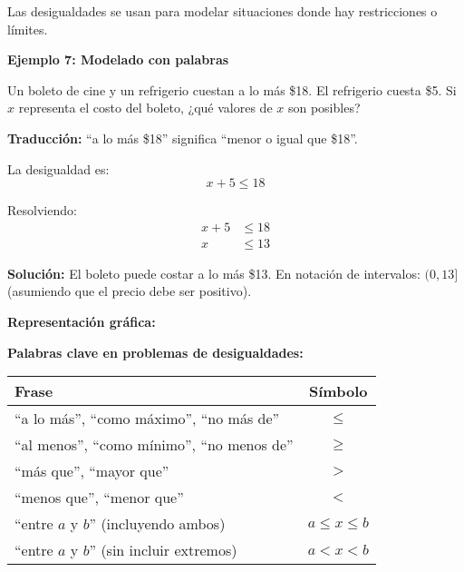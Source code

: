 Las desigualdades se usan para modelar situaciones donde hay restricciones o límites.

\begin{example}
\textbf{Ejemplo 7: Modelado con palabras}

Un boleto de cine y un refrigerio cuestan a lo más \$18. El refrigerio cuesta \$5. Si $x$ representa el costo del boleto, ¿qué valores de $x$ son posibles?

\solution

\textbf{Traducción:} ``a lo más \$18'' significa ``menor o igual que \$18''.

La desigualdad es:
\[x + 5 \le 18\]

Resolviendo:
\begin{align*}
x + 5 &\le 18 \\
x &\le 13
\end{align*}

\textbf{Solución:} El boleto puede costar a lo más \$13. En notación de intervalos: $(0, 13]$ (asumiendo que el precio debe ser positivo).

\textbf{Representación gráfica:}

\begin{center}
\end{center}
\end{example}

\vspace{1cm}

\textbf{Palabras clave en problemas de desigualdades:}

\begin{center}
\begin{tabular}{|l|c|}
\hline
\textbf{Frase} & \textbf{Símbolo} \\
\hline
``a lo más'', ``como máximo'', ``no más de'' & $\le$ \\
``al menos'', ``como mínimo'', ``no menos de'' & $\ge$ \\
``más que'', ``mayor que'' & $>$ \\
``menos que'', ``menor que'' & $<$ \\
``entre $a$ y $b$'' (incluyendo ambos) & $a \le x \le b$ \\
``entre $a$ y $b$'' (sin incluir extremos) & $a < x < b$ \\
\hline
\end{tabular}
\end{center}
